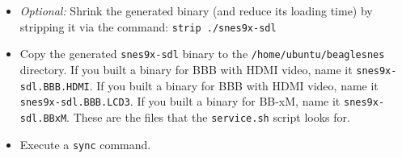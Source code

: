 \begin{itemize}
\item \emph{Optional:} Shrink the generated binary (and reduce its loading time) by stripping it via the command: \texttt{strip ./snes9x-sdl}
\item Copy the generated \texttt{snes9x-sdl} binary to the \texttt{/home/ubuntu/beaglesnes} directory.  If you built a binary for BBB with HDMI video, name it \texttt{snes9x-sdl.BBB.HDMI}.  If you built a binary for BBB with HDMI video, name it \texttt{snes9x-sdl.BBB.LCD3}. If you built a binary for BB-xM, name it \texttt{snes9x-sdl.BBxM}.  These are the files that the \texttt{service.sh} script looks for.
\item Execute a \texttt{sync} command. 
\end{itemize}